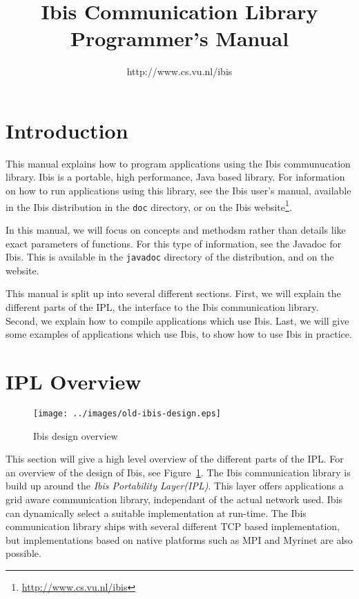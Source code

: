 \documentclass[10pt]{article}
\begin{document}
\title{Ibis Communication Library Programmer's Manual}

\author{http://www.cs.vu.nl/ibis}

\maketitle

\section{Introduction}

This manual explains how to program applications using the Ibis
communucation library. Ibis is a portable, high performance, Java based
library. For information on how to run applications using this library,
see the Ibis user's manual, available in the Ibis distribution in the
\texttt{doc} directory, or on the Ibis
website\footnote{\url{http://www.cs.vu.nl/ibis}}.

In this manual, we will focus on concepts and methodsm rather than
details like exact parameters of functions. For this type of
information, see the Javadoc for Ibis. This is available in the
\texttt{javadoc} directory of the distribution, and on the website.

This manual is split up into several different sections. First, we will
explain the different parts of the IPL, the interface to the Ibis
communication library. Second, we explain how to compile applications
which use Ibis. Last, we will give some examples of applications which
use Ibis, to show how to use Ibis in practice.

\section{IPL Overview}


\begin{figure} \centering
\texttt{[image: ../images/old-ibis-design.eps]}
\caption{Ibis design overview} \label{design}
\end{figure}

This section will give a high level overview of the different parts of
the IPL.  For an overview of the design of Ibis, see
Figure~\ref{design}. The Ibis communication library is build up around
the \emph{Ibis Portability Layer(IPL)}. This layer offers applications a
grid aware communication library, independant of the actual network
used. Ibis can dynamically select a suitable implementation at run-time.
The Ibis communication library ships with several different TCP based
implementation, but implementations based on native platforms such as
MPI and Myrinet are also possible.
\end{document}
